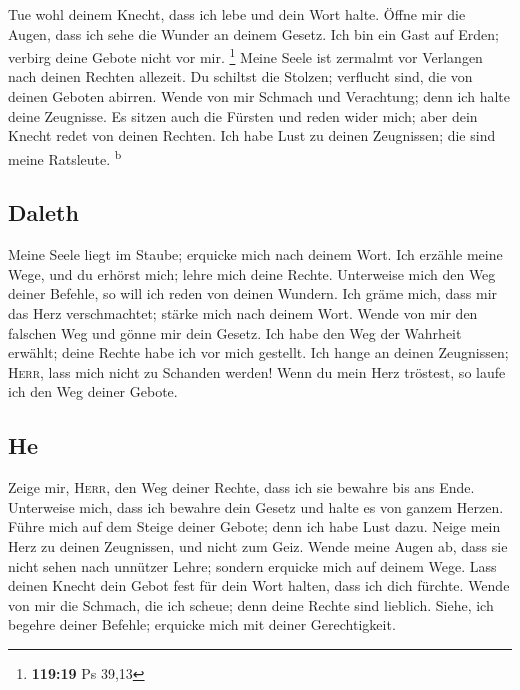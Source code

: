  Tue wohl deinem Knecht, dass ich lebe und dein Wort
halte.  Öffne mir die Augen, dass ich sehe die Wunder an
deinem Gesetz.  Ich bin ein Gast auf Erden; verbirg deine
Gebote nicht vor mir. \footnote{\textbf{119:19} Ps 39,13}
 Meine Seele ist zermalmt vor Verlangen nach deinen
Rechten allezeit.  Du schiltst die Stolzen; verflucht
sind, die von deinen Geboten abirren.  Wende von mir
Schmach und Verachtung; denn ich halte deine Zeugnisse. 
Es sitzen auch die Fürsten und reden wider mich; aber dein Knecht redet
von deinen Rechten.  Ich habe Lust zu deinen Zeugnissen;
die sind meine Ratsleute. \textsuperscript{b}

\hypertarget{daleth}{%
\subsection{Daleth}\label{daleth}}

 Meine Seele liegt im Staube; erquicke mich nach deinem
Wort.  Ich erzähle meine Wege, und du erhörst mich; lehre
mich deine Rechte.  Unterweise mich den Weg deiner
Befehle, so will ich reden von deinen Wundern.  Ich gräme
mich, dass mir das Herz verschmachtet; stärke mich nach deinem Wort.
 Wende von mir den falschen Weg und gönne mir dein
Gesetz.  Ich habe den Weg der Wahrheit erwählt; deine
Rechte habe ich vor mich gestellt.  Ich hange an deinen
Zeugnissen; \textsc{Herr}, lass mich nicht zu Schanden werden!
 Wenn du mein Herz tröstest, so laufe ich den Weg deiner
Gebote.

\hypertarget{he}{%
\subsection{He}\label{he}}

 Zeige mir, \textsc{Herr}, den Weg deiner Rechte, dass
ich sie bewahre bis ans Ende.  Unterweise mich, dass ich
bewahre dein Gesetz und halte es von ganzem Herzen. 
Führe mich auf dem Steige deiner Gebote; denn ich habe Lust dazu.
 Neige mein Herz zu deinen Zeugnissen, und nicht zum
Geiz.  Wende meine Augen ab, dass sie nicht sehen nach
unnützer Lehre; sondern erquicke mich auf deinem Wege. 
Lass deinen Knecht dein Gebot fest für dein Wort halten, dass ich dich
fürchte.  Wende von mir die Schmach, die ich scheue; denn
deine Rechte sind lieblich.  Siehe, ich begehre deiner
Befehle; erquicke mich mit deiner Gerechtigkeit.


